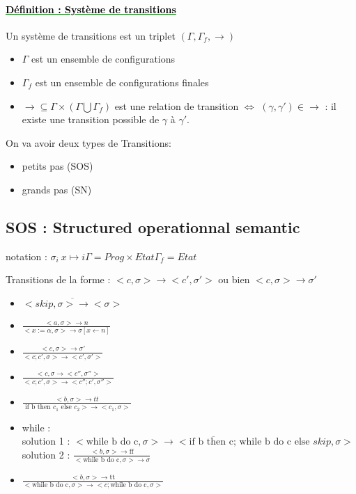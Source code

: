\documentclass[10pt,a4paper]{article}
\newenvironment{definition}[1]{
	\paragraph{ 	
		\textcolor{green}{
			\underline{ \textcolor{black}{Définition : #1}} } }	} {}
\begin{document}
\begin{definition}{Système de transitions} Un système de transitions est un triplet $(\Gamma, \Gamma_f, \rightarrow )$ \begin{itemize}
\item $\Gamma$ est un ensemble de configurations
\item $\Gamma_f$ est un ensemble de configurations finales
\item $\rightarrow \subseteq \Gamma \times (\Gamma \bigcup \Gamma_f )$ est une relation de transition $\Leftrightarrow$
$(\gamma, \gamma' ) \in \rightarrow$ : il existe une transition possible de $\gamma$ à $\gamma'$.
\end{itemize}
\end{definition}
On va avoir deux types de Transitions: \begin{itemize}
\item petits pas (SOS)
\item grands pas (SN)
\end{itemize}

\subsection{SOS : Structured operationnal semantic}
notation : $\sigma_i ~ x \mapsto i

\Gamma = Prog \times Etat

\Gamma_f = Etat$

Transitions de la forme : $<c, \sigma> \rightarrow <c', \sigma'>$ ou bien $<c, \sigma> \rightarrow \sigma'$\\
\begin{itemize}


\item $\displaystyle \overline{ <skip, \sigma > \rightarrow <\sigma> }$
\item $\displaystyle\frac{<a, \sigma > \rightarrow n }{ < x := \alpha , \sigma > \rightarrow \sigma [x \leftarrow n ] }$
\item $\displaystyle \frac{ <c, \sigma > \rightarrow \sigma' }{  < c; c' , \sigma > \rightarrow <c', \sigma'> }$
\item $\displaystyle \frac{< c, \sigma \rightarrow <c'', \sigma''>}{ <c; c', \sigma > \rightarrow <c''; c', \sigma'' > }$
\item $\displaystyle \frac{ <b, \sigma> \rightarrow tt }{\text{ if b then }  c_1\text{ else }c_2> \rightarrow <c_1, \sigma > }$
\item while : \\
 solution 1 : $\displaystyle \overline{ < \text{while b do c}, \sigma > \rightarrow < \text{if b then c; while b do c else }skip, \sigma > }$\\
 
solution 2 : $\displaystyle \frac{ < b, \sigma > \rightarrow \text{ff}}{ < \text{while b do c}, \sigma > \rightarrow \sigma }$
\item $\displaystyle  \frac{ < b, \sigma > \rightarrow \text{tt}}{ < \text{while b do c}, \sigma > \rightarrow <c;\text{while b do c}, \sigma >}$
\end{itemize}
\end{document}
